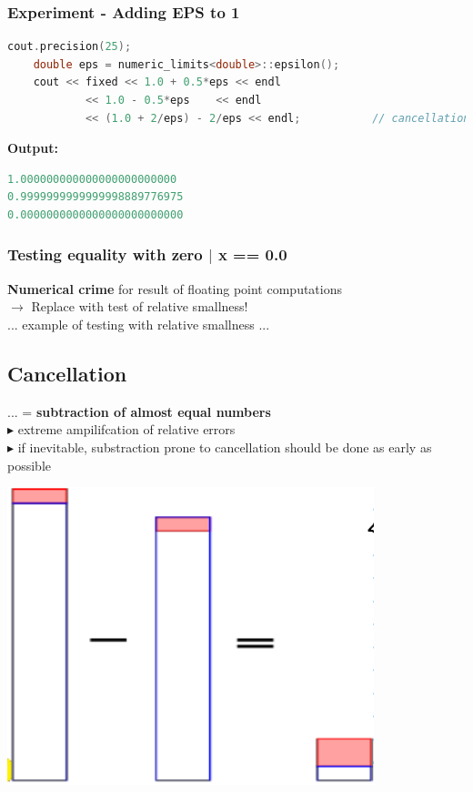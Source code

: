 \documentclass[12pt, a4paper]{article}
\begin{document}
\subsubsection{Experiment - Adding EPS to 1}
\begin{lstlisting}[language=C++]
	cout.precision(25);
	double eps = numeric_limits<double>::epsilon();
	cout << fixed << 1.0 + 0.5*eps << endl
			<< 1.0 - 0.5*eps	<< endl
			<< (1.0 + 2/eps) - 2/eps << endl;			// cancellation here
\end{lstlisting}

\textbf{Output:} 

\begin{lstlisting}[language=c++]
1.000000000000000000000000
0.9999999999999998889776975
0.0000000000000000000000000
\end{lstlisting}


\hspace{5mm}	
\subsubsection{Testing equality with zero $|$ x == 0.0} 
\textbf{Numerical crime} for result of floating point computations \\
$\rightarrow$ Replace with test of relative smallness! \\
	
	... example of testing with relative smallness ...
	
\hspace{6mm}

	
\subsection{Cancellation}
 

 \begin{minipage}{0.6\textwidth}
 	... = \textbf{subtraction of almost equal numbers} \\
 $\blacktriangleright$ extreme ampilifcation of relative errors \\
 $\blacktriangleright$ if inevitable, substraction prone to cancellation should be done as early as possible
 \end{minipage}
\hfill
 \begin{minipage}{0.3\textwidth}\raggedleft
 		 \includegraphics[width=0.8\textwidth]{cancellation_illustration.png}
 \end{minipage}
\end{document}
